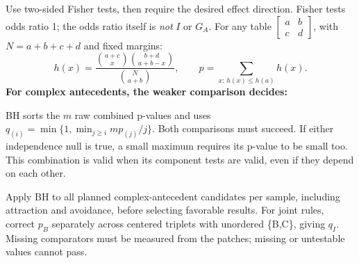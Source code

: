 \documentclass[10pt,a4paper]{article}
\newcommand{\A}{A}
\begin{document}
Use two-sided Fisher tests, then require the desired effect direction. Fisher tests odds ratio 1; the odds ratio itself is \emph{not} $I$ or $G_A$. For any table $\left[\begin{smallmatrix}a&b\\c&d\end{smallmatrix}\right]$, with $N=a+b+c+d$ and fixed margins:
\[
 h(x)=\frac{\binom{a+c}{x}\binom{b+d}{a+b-x}}{\binom{N}{a+b}},
 \qquad p=\sum_{x:\,h(x)\le h(a)}h(x).
\]
\textbf{For complex antecedents, the weaker comparison decides:}
\begin{center}
\end{center}
\vspace{-2mm}
BH sorts the $m$ raw combined p-values and uses
$q_{(i)}=\min\{1,\min_{j\ge i}m p_{(j)}/j\}$.
Both comparisons must succeed. If either independence null is true, a small maximum requires its p-value to be small too. This combination is valid when its component tests are valid, even if they depend on each other.

Apply BH to all planned complex-antecedent candidates per sample, including attraction and avoidance, before selecting favorable results. For joint rules, correct $p_B$ separately across centered triplets with unordered \{B,C\}, giving $q_I$. Missing comparators must be measured from the patches; missing or untestable values cannot pass.
\end{document}
